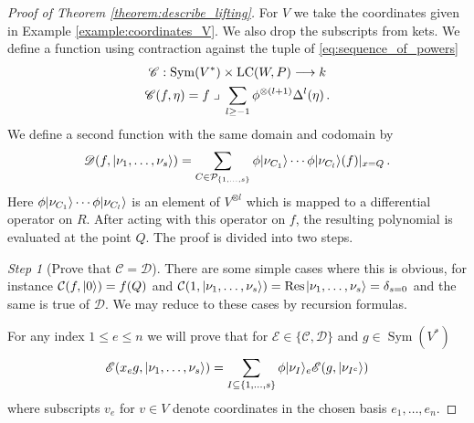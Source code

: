 \documentclass[english,letter paper,12pt,reqno]{article}
\DeclarePairedDelimiter\ket{\lvert}{\rangle}
\theoremstyle{example}
\numberwithin{equation}{section}
\DeclareMathOperator{\Sym}{Sym}
\DeclareMathOperator{\LC}{LC}
\begin{document}
\begin{proof}[Proof of Theorem \ref{theorem:describe_lifting}] For $V$ we take the coordinates given in Example \ref{example:coordinates_V}. We also drop the subscripts from kets. We define a function using contraction against the tuple of \eqref{eq:sequence_of_powers}
\begin{gather*}
\mathscr{C}: \Sym(V^*) \times \LC( W, P ) \lto k\\
\mathscr{C}(f, \eta) = f \; \lrcorner \; \sum_{l \ge -1} \phi^{\otimes (l+1)} \Delta^l( \eta )\,.
\end{gather*}
We define a second function with the same domain and codomain by
\[
\mathscr{D}(f, \ket{\nu_1, \ldots, \nu_s}) = \sum_{C \in \cat{P}_{\{1,\ldots,s\}}} \phi \ket{\nu_{C_1}} \cdots \phi \ket{\nu_{C_l}}(f)\arrowvert_{x = Q}\,.
\]
Here $\phi \ket{\nu_{C_1}} \cdots \phi \ket{\nu_{C_l}}$ is an element of $V^{\otimes l}$ which is mapped to a differential operator on $R$. After acting with this operator on $f$, the resulting polynomial is evaluated at the point $Q$. The proof is divided into two steps.

\emph{Step 1} (Prove that $\mathscr{C} = \mathscr{D}$). There are some simple cases where this is obvious, for instance $\cat{C}(f, \ket{0}) = f( Q )$ and $\cat{C}( 1, \ket{\nu_1,\ldots,\nu_s} ) = \Res\;\ket{\nu_1,\ldots,\nu_s} = \delta_{s = 0}$ and the same is true of $\mathscr{D}$. We may reduce to these cases by recursion formulas.

For any index $1 \le e \le n$ we will prove that for $\mathscr{E} \in \{ \mathscr{C}, \mathscr{D} \}$ and $g \in \Sym(V^*)$
\begin{equation}\label{eq:recur_formula}
\mathscr{E}( x_e g, \ket{\nu_1,\ldots,\nu_s} ) = \sum_{I \subseteq \{ 1,\ldots,s\}} \phi\ket{\nu_I}_e \mathscr{E}( g, \ket{\nu_{I^c}})
\end{equation}
where subscripts $v_e$ for $v \in V$ denote coordinates in the chosen basis $e_1,\ldots,e_n$.


\end{proof}
\end{document}

